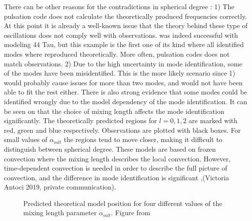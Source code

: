   There can be other reasons for the contradictions in spherical degree : 1) The pulsation code does not calculate the theoretically produced frequencies correctly. At this point it is already a well-known issue that the theory behind these type of oscillations does not comply well with observations. \citet{lenz2010delta} was indeed successful with modeling 44 Tau, but this example is the first one of its kind where all identified modes where reproduced theoretically. More often, pulsation codes does not match observations. 2) Due to the high uncertainty in mode identification, some of the modes have been misidentified. This is the more likely scenario since 1) would probably cause issues for more than two modes, and would not have been able to fit the rest either. There is also strong evidence that some modes could be identified wrongly due to the model dependency of the mode identification. It can be seen on  that the choice of mixing length affects the mode identification significantly. The theoretically predicted regions for $l=0,1,2$ are marked with red, green and blue respectively. Observations are plotted with black boxes. For small values of $\alpha_{mlt}$ the regions tend to move closer, making it difficult to distinguish between spherical degree. These models are based on frozen convection where the mixing length describes the local convection. However, time-dependent convection is needed in order to describe the full picture of convection, and the difference in mode identification is significant \citep{dupret2005time},(Victoria Antoci 2019, private communication).
\begin{figure}[htbp]
	\centering
	\caption{Predicted theoretical model position for four different values of the mixing length parameter $\alpha_{mlt}$.  Figure from \citet{lenz2009diss}  }
	\label{lenzdiss}
\end{figure}

